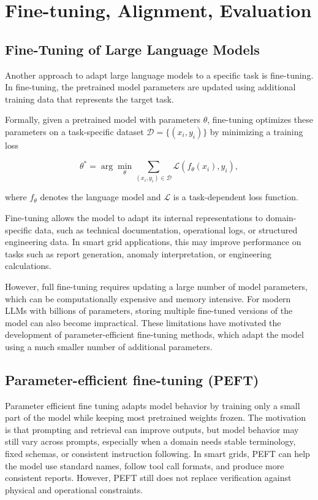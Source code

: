 \documentclass[journal,onecolumn]{IEEEtran} %
\begin{document}
\section{Fine-tuning, Alignment, Evaluation}
\label{sec:SFT_RL}
\subsection{Fine-Tuning of Large Language Models}
Another approach to adapt large language models to a specific task is fine-tuning. In fine-tuning, the pretrained model parameters are updated using additional training data that represents the target task.

Formally, given a pretrained model with parameters $\theta$, fine-tuning optimizes these parameters on a task-specific dataset $\mathcal{D} = \{(x_i, y_i)\}$ by minimizing a training loss

\begin{equation}
\theta^* = \arg\min_{\theta} \sum_{(x_i,y_i)\in\mathcal{D}}
\mathcal{L}(f_{\theta}(x_i), y_i),
\end{equation}

where $f_{\theta}$ denotes the language model and $\mathcal{L}$ is a task-dependent loss function.

Fine-tuning allows the model to adapt its internal representations to domain-specific data, such as technical documentation, operational logs, or structured engineering data. In smart grid applications, this may improve performance on tasks such as report generation, anomaly interpretation, or engineering calculations.

However, full fine-tuning requires updating a large number of model parameters, which can be computationally expensive and memory intensive. For modern LLMs with billions of parameters, storing multiple fine-tuned versions of the model can also become impractical. These limitations have motivated the development of parameter-efficient fine-tuning methods, which adapt the model using a much smaller number of additional parameters.


\subsection{Parameter-efficient fine-tuning (PEFT)}
Parameter efficient fine tuning adapts model behavior by training only a small part of the model while keeping most pretrained weights frozen. The motivation is that prompting and retrieval can improve outputs, but model behavior may still vary across prompts, especially when a domain needs stable terminology, fixed schemas, or consistent instruction following. In smart grids, PEFT can help the model use standard names, follow tool call formats, and produce more consistent reports. However, PEFT still does not replace verification against physical and operational constraints.
\end{document}
